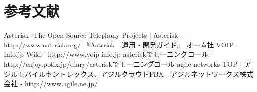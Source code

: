 \section{参考文献}
Asterisk- The Open Source Telephony Projects | Asterisk - http://www.asterisk.org/
『Asterisk　運用・開発ガイド』 オーム社
VOIP-Info.jp Wiki - http://www.voip-info.jp
asteriskでモーニングコール - http://enjoy.potix.jp/diary/asteriskでモーニングコール
agile networks TOP | アジルモバイルセントレックス、アジルクラウドPBX | アジルネットワークス株式会社 - http://www.agile.ne.jp/

